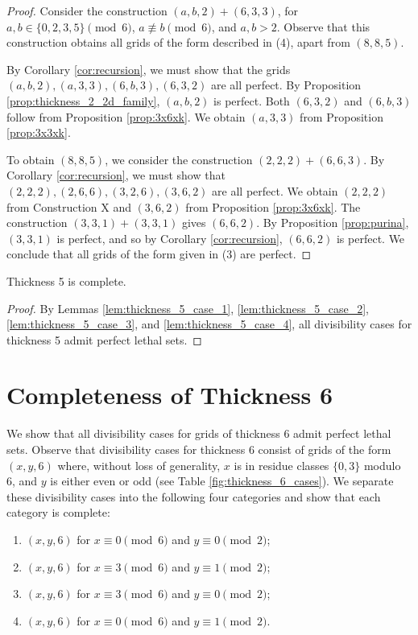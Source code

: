 \begin{proof}
Consider the construction $(a,b,2) + (6,3,3)$, for $a,b \in \{0,2,3,5\} \pmod 6$, $a \not\equiv b \pmod 6$, and $a,b > 2$. Observe that this construction obtains all grids of the form described in (4), apart from $(8,8,5)$.

By Corollary \ref{cor:recursion}, we must show that the grids $(a,b,2), (a,3,3), (6,b,3), (6,3,2)$ are all perfect. By Proposition \ref{prop:thickness_2_2d_family}, $(a,b,2)$ is perfect. Both $(6,3,2)$ and $(6,b,3)$ follow from Proposition \ref{prop:3x6xk}. We obtain $(a,3,3)$ from Proposition \ref{prop:3x3xk}.

To obtain $(8,8,5)$, we consider the construction $(2,2,2) + (6,6,3)$. By Corollary \ref{cor:recursion}, we must show that $(2,2,2), (2,6,6), (3,2,6), (3,6,2)$ are all perfect. We obtain $(2,2,2)$ from Construction X and $(3,6,2)$ from Proposition \ref{prop:3x6xk}. The construction $(3,3,1)+(3,3,1)$ gives $(6,6,2)$. By Proposition \ref{prop:purina}, $(3,3,1)$ is perfect, and so by Corollary \ref{cor:recursion}, $(6,6,2)$ is perfect. We conclude that all grids of the form given in (3) are perfect.
\end{proof}

\begin{lem}
\label{lem:thickness_5_complete}
Thickness 5 is complete.
\end{lem}

\begin{proof}
By Lemmas \ref{lem:thickness_5_case_1}, \ref{lem:thickness_5_case_2}, \ref{lem:thickness_5_case_3}, and \ref{lem:thickness_5_case_4}, all divisibility cases for thickness 5 admit perfect lethal sets.
\end{proof}

\section{Completeness of Thickness 6}
We show that all divisibility cases for grids of thickness 6 admit perfect lethal sets. Observe that divisibility cases for thickness 6 consist of grids of the form $(x,y,6)$ where, without loss of generality, $x$ is in residue classes $\{0,3\}$ modulo 6, and $y$ is either even or odd (see Table \ref{fig:thickness_6_cases}). We separate these divisibility cases into the following four categories and show that each category is complete:

\begin{enumerate}
\item $(x,y,6)$ for $x \equiv 0 \pmod 6$ and $y \equiv 0 \pmod 2$;
\item $(x,y,6)$ for $x \equiv 3 \pmod 6$ and $y \equiv 1 \pmod 2$;
\item $(x,y,6)$ for $x \equiv 3 \pmod 6$ and $y \equiv 0 \pmod 2$;
\item $(x,y,6)$ for $x \equiv 0 \pmod 6$ and $y \equiv 1 \pmod 2$.
\end{enumerate}

